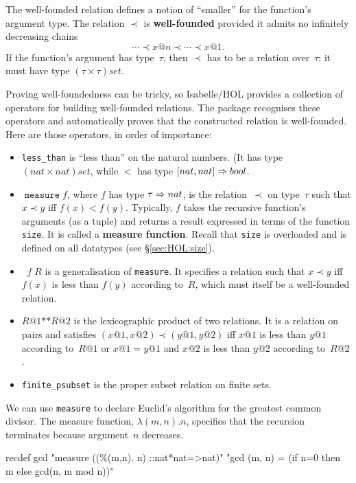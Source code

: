 The well-founded relation defines a notion of ``smaller'' for the function's
argument type.  The relation $\prec$ is \textbf{well-founded} provided it
admits no infinitely decreasing chains
\[ \cdots\prec x@n\prec\cdots\prec x@1. \]
If the function's argument has type~$\tau$, then $\prec$ has to be a relation
over~$\tau$: it must have type $(\tau\times\tau)set$.

Proving well-foundedness can be tricky, so Isabelle/HOL provides a collection
of operators for building well-founded relations.  The package recognises
these operators and automatically proves that the constructed relation is
well-founded.  Here are those operators, in order of importance:
\begin{itemize}
\item \texttt{less_than} is ``less than'' on the natural numbers.
  (It has type $(nat\times nat)set$, while $<$ has type $[nat,nat]\Rightarrow bool$.
  
\item $\mathop{\mathtt{measure}} f$, where $f$ has type $\tau\Rightarrow nat$, is the
  relation~$\prec$ on type~$\tau$ such that $x\prec y$ iff $f(x)<f(y)$.
  Typically, $f$ takes the recursive function's arguments (as a tuple) and
  returns a result expressed in terms of the function \texttt{size}.  It is
  called a \textbf{measure function}.  Recall that \texttt{size} is overloaded
  and is defined on all datatypes (see \S\ref{sec:HOL:size}).
                                                    
\item $\mathop{\mathtt{inv_image}} f\;R$ is a generalisation of
  \texttt{measure}.  It specifies a relation such that $x\prec y$ iff $f(x)$
  is less than $f(y)$ according to~$R$, which must itself be a well-founded
  relation.

\item $R@1\texttt{**}R@2$ is the lexicographic product of two relations.  It
  is a relation on pairs and satisfies $(x@1,x@2)\prec(y@1,y@2)$ iff $x@1$
  is less than $y@1$ according to~$R@1$ or $x@1=y@1$ and $x@2$
  is less than $y@2$ according to~$R@2$.

\item \texttt{finite_psubset} is the proper subset relation on finite sets.
\end{itemize}

We can use \texttt{measure} to declare Euclid's algorithm for the greatest
common divisor.  The measure function, $\lambda(m,n). n$, specifies that the
recursion terminates because argument~$n$ decreases.
\begin{ttbox}
recdef gcd "measure ((\%(m,n). n) ::nat*nat=>nat)"
    "gcd (m, n) = (if n=0 then m else gcd(n, m mod n))"
\end{ttbox}

